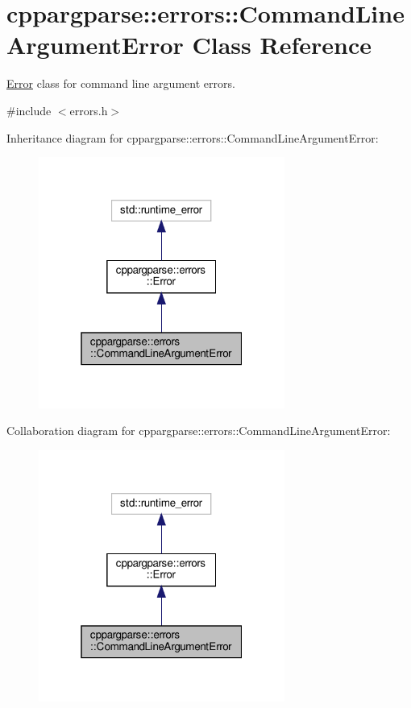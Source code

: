 \hypertarget{classcppargparse_1_1errors_1_1CommandLineArgumentError}{}\section{cppargparse\+:\+:errors\+:\+:Command\+Line\+Argument\+Error Class Reference}
\label{classcppargparse_1_1errors_1_1CommandLineArgumentError}


\hyperlink{classcppargparse_1_1errors_1_1Error}{Error} class for command line argument errors.  




{\ttfamily \#include $<$errors.\+h$>$}



Inheritance diagram for cppargparse\+:\+:errors\+:\+:Command\+Line\+Argument\+Error\+:\nopagebreak
\begin{figure}[H]
\begin{center}
\leavevmode
\includegraphics[width=229pt]{classcppargparse_1_1errors_1_1CommandLineArgumentError__inherit__graph}
\end{center}
\end{figure}


Collaboration diagram for cppargparse\+:\+:errors\+:\+:Command\+Line\+Argument\+Error\+:\nopagebreak
\begin{figure}[H]
\begin{center}
\leavevmode
\includegraphics[width=229pt]{classcppargparse_1_1errors_1_1CommandLineArgumentError__coll__graph}
\end{center}
\end{figure}

